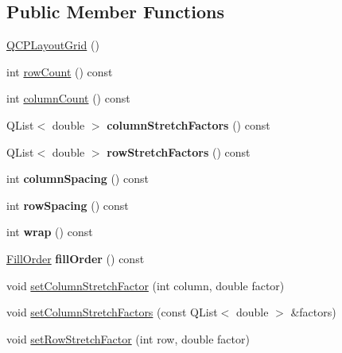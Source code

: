 \subsection*{Public Member Functions}
\begin{DoxyCompactItemize}
\item 
\hyperlink{classQCPLayoutGrid_ab2a4c1587dc8aed4c41c509c8d8d2a64}{Q\+C\+P\+Layout\+Grid} ()
\item 
int \hyperlink{classQCPLayoutGrid_a19c66fd76cbce58a8e94f33797e0c0aa}{row\+Count} () const
\item 
int \hyperlink{classQCPLayoutGrid_a1a2962cbf45011405b64b913afa8e7a2}{column\+Count} () const
\item 
\mbox{\label{classQCPLayoutGrid_a8e0e587c386bbcd1b94119f5f44c512d}} 
Q\+List$<$ double $>$ {\bfseries column\+Stretch\+Factors} () const
\item 
\mbox{\label{classQCPLayoutGrid_aa33408586427e77e05f79defde7f3568}} 
Q\+List$<$ double $>$ {\bfseries row\+Stretch\+Factors} () const
\item 
\mbox{\label{classQCPLayoutGrid_adcf4c387d5996bf6e4ae0ed26138247e}} 
int {\bfseries column\+Spacing} () const
\item 
\mbox{\label{classQCPLayoutGrid_a4cb6c680505cd0ce6f85b9e217fd2cd0}} 
int {\bfseries row\+Spacing} () const
\item 
\mbox{\label{classQCPLayoutGrid_a8bb71b52b2796c9f05fae6a32d2d0efd}} 
int {\bfseries wrap} () const
\item 
\mbox{\label{classQCPLayoutGrid_a6cb6563a13759222ad92ae397bd6c27e}} 
\hyperlink{classQCPLayoutGrid_a7d49ee08773de6b2fd246edfed353cca}{Fill\+Order} {\bfseries fill\+Order} () const
\item 
void \hyperlink{classQCPLayoutGrid_ae38f31a71687b9d7ee3104852528fb50}{set\+Column\+Stretch\+Factor} (int column, double factor)
\item 
void \hyperlink{classQCPLayoutGrid_a6c2591d1a7e2534ce036989543b49e57}{set\+Column\+Stretch\+Factors} (const Q\+List$<$ double $>$ \&factors)
\item 
void \hyperlink{classQCPLayoutGrid_a7b0273de5369bd93d942edbaf5b166ec}{set\+Row\+Stretch\+Factor} (int row, double factor)

\end{DoxyCompactItemize}
